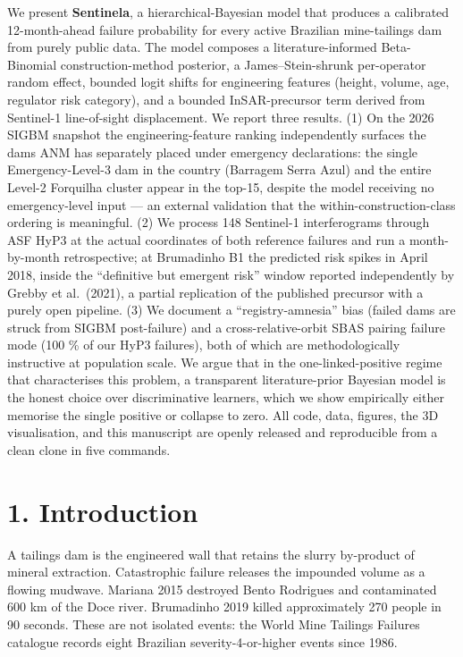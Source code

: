 \documentclass[
  11pt]{article}
\begin{document}
We present \textbf{Sentinela}, a hierarchical-Bayesian model that
produces a calibrated 12-month-ahead failure probability for every
active Brazilian mine-tailings dam from purely public data. The model
composes a literature-informed Beta-Binomial construction-method
posterior, a James--Stein-shrunk per-operator random effect, bounded
logit shifts for engineering features (height, volume, age, regulator
risk category), and a bounded InSAR-precursor term derived from
Sentinel-1 line-of-sight displacement. We report three results. (1) On
the 2026 SIGBM snapshot the engineering-feature ranking independently
surfaces the dams ANM has separately placed under emergency
declarations: the single Emergency-Level-3 dam in the country (Barragem
Serra Azul) and the entire Level-2 Forquilha cluster appear in the
top-15, despite the model receiving no emergency-level input --- an
external validation that the within-construction-class ordering is
meaningful. (2) We process 148 Sentinel-1 interferograms through ASF
HyP3 at the actual coordinates of both reference failures and run a
month-by-month retrospective; at Brumadinho B1 the predicted risk spikes
in April 2018, inside the ``definitive but emergent risk'' window
reported independently by Grebby et al.~(2021), a partial replication of
the published precursor with a purely open pipeline. (3) We document a
``registry-amnesia'' bias (failed dams are struck from SIGBM
post-failure) and a cross-relative-orbit SBAS pairing failure mode (100
\% of our HyP3 failures), both of which are methodologically instructive
at population scale. We argue that in the one-linked-positive regime
that characterises this problem, a transparent literature-prior Bayesian
model is the honest choice over discriminative learners, which we show
empirically either memorise the single positive or collapse to zero. All
code, data, figures, the 3D visualisation, and this manuscript are
openly released and reproducible from a clean clone in five commands.

\section{1. Introduction}\label{introduction}

A tailings dam is the engineered wall that retains the slurry by-product
of mineral extraction. Catastrophic failure releases the impounded
volume as a flowing mudwave. Mariana 2015 destroyed Bento Rodrigues and
contaminated 600 km of the Doce river. Brumadinho 2019 killed
approximately 270 people in 90 seconds. These are not isolated events:
the World Mine Tailings Failures catalogue records eight Brazilian
severity-4-or-higher events since 1986.
\end{document}

